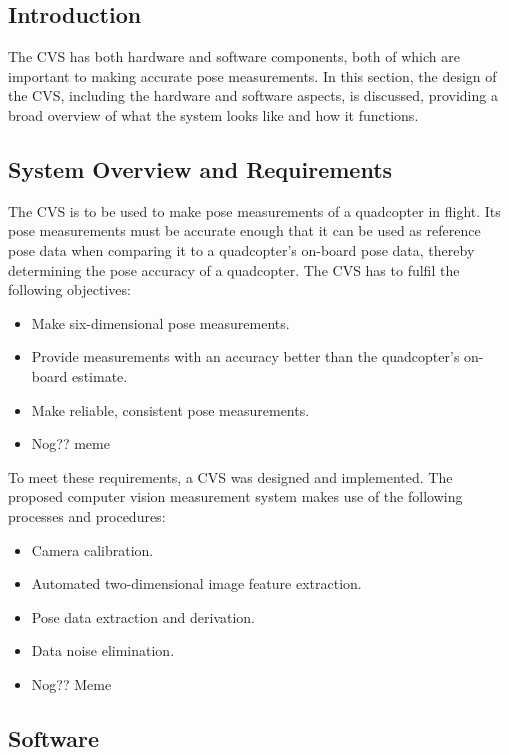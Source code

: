 \subsection{Introduction}

The CVS has both hardware and software components, both of which are important to making accurate pose measurements. In this section, the design of the CVS, including the hardware and software aspects, is discussed, providing a broad overview of what the system looks like and how it functions. 

\subsection{System Overview and Requirements}

The CVS is to be used to make pose measurements of a quadcopter in flight. Its pose measurements must be accurate enough that it can be used as reference pose data when comparing it to a quadcopter's on-board pose data, thereby determining the pose accuracy of a quadcopter. The CVS has to fulfil the following objectives:

\begin{itemize}
  \item Make six-dimensional pose measurements.
  \item Provide measurements with an accuracy better than the quadcopter's on-board estimate.
  \item Make reliable, consistent pose measurements.
  \item Nog?? meme
\end{itemize}

To meet these requirements, a CVS was designed and implemented. The proposed computer vision measurement system makes use of the following processes and procedures: 

\begin{itemize}
  \item Camera calibration.
  \item Automated two-dimensional image feature extraction.
  \item Pose data extraction and derivation.
  \item Data noise elimination. 
  \item Nog?? Meme
\end{itemize}

\subsection{Software}
\label{sec:cv-sys-software}

